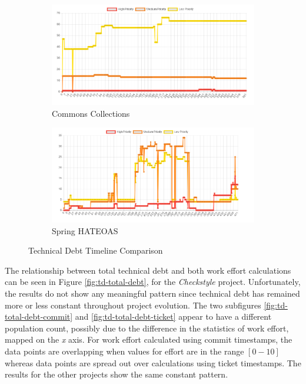 \documentclass{mpaper}
\begin{document}
\begin{figure}
	\centering
	\begin{subfigure}{.45\textwidth}
		\includegraphics[width=\linewidth]{images/collections_td_timeline.png}
		\caption{Commons Collections}
		\label{fig:collections-td-timeline}
	\end{subfigure}
	\begin{subfigure}{.45\textwidth}
		\includegraphics[width=\linewidth]{images/spring_td_timeline.png}
		\caption{Spring HATEOAS}
		\label{fig:spring-td-timeline}
	\end{subfigure}
	\caption{Technical Debt Timeline Comparison}
	\label{fig:td-timeline}
\end{figure}

The relationship between total technical debt and both work effort calculations
can be seen in Figure \ref{fig:td-total-debt}, for the \emph{Checkstyle}
project. Unfortunately, the results do not show any meaningful pattern since
technical debt has remained more or less constant throughout project evolution.
The two subfigures \ref{fig:td-total-debt-commit} and
\ref{fig:td-total-debt-ticket} appear to have a different population count,
possibly due to the difference in the statistics of work effort, mapped on the
\emph{x} axis. For work effort calculated using commit timestamps, the data
points are overlapping when values for effort are in the range $[0-10]$ whereas
data points are spread out over calculations using ticket timestamps. The
results for the other projects show the same constant pattern. 
\end{document}
